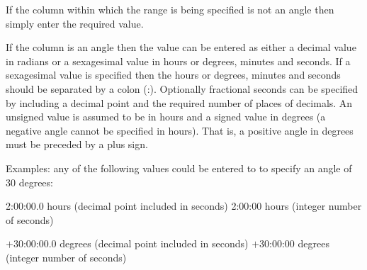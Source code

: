\documentclass[twoside,11pt]{article}
\renewcommand{\_}{\texttt{\symbol{95}}}
\begin{document}
\begin{htmlonly}
{{{         If the column within which the range is being specified is
         not an angle then simply enter the required value.

         If the column is an angle then the value can be entered as
         either a decimal value in radians or a sexagesimal value in
         hours or degrees, minutes and seconds.  If a sexagesimal value
         is specified then the hours or degrees, minutes and seconds
         should be separated by a colon (:).  Optionally fractional
         seconds can be specified by including a decimal point and the
         required number of places of decimals.  An unsigned value is
         assumed to be in hours and a signed value in degrees (a
         negative angle cannot be specified in hours).  That is,
         a positive angle in degrees must be preceded by a plus sign.

         Examples: any of the following values could be entered to
         to specify an angle of 30 degrees:

             2:00:00.0   hours (decimal point included in seconds)
             2:00:00     hours (integer number of seconds)

           $+$30:00:00.0   degrees (decimal point included in seconds)
           $+$30:00:00     degrees (integer number of seconds)

}}}
\end{htmlonly}
\end{document}
